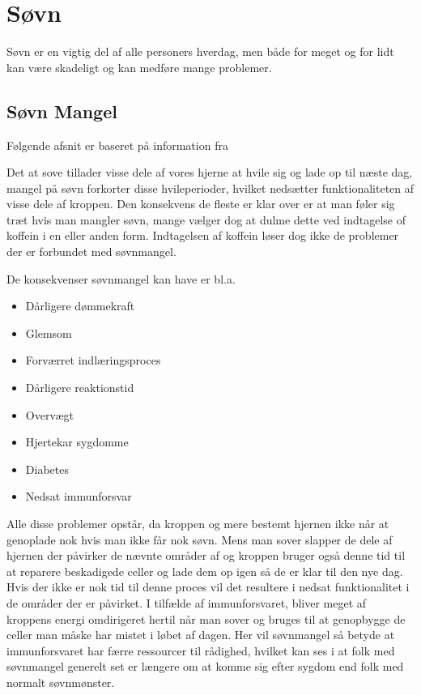 \section{Søvn}
Søvn er en vigtig del af alle personers hverdag, men både for meget og for lidt kan være skadeligt og kan medføre mange problemer.

\subsection{Søvn Mangel}
Følgende afsnit er baseret på information fra \citep{misc:tenThings} \citep{misc:getSleep}

Det at sove tillader visse dele af vores hjerne at hvile sig og lade op til næste dag, mangel på søvn forkorter disse hvileperioder, hvilket nedsætter funktionaliteten af visse dele af kroppen.
Den konsekvens de fleste er klar over er at man føler sig træt hvis man mangler søvn, mange vælger dog at dulme dette ved indtagelse of koffein i en eller anden form.
Indtagelsen af koffein løser dog ikke de problemer der er forbundet med søvnmangel. 

De konsekvenser søvnmangel kan have er bl.a.
\begin{itemize}
\item Dårligere dømmekraft
\item Glemsom
\item Forværret indlæringsproces
\item Dårligere reaktionstid
\item Overvægt
\item Hjertekar sygdomme
\item Diabetes
\item Nedsat immunforsvar
\end{itemize}

Alle disse problemer opstår, da kroppen og mere bestemt hjernen ikke når at genoplade nok hvis man ikke får nok søvn.
Mens man sover slapper de dele af hjernen der påvirker de nævnte områder af og kroppen bruger også denne tid til at reparere beskadigede celler og lade dem op igen så de er klar til den nye dag.
Hvis der ikke er nok tid til denne proces vil det resultere i nedsat funktionalitet i de områder der er påvirket.
I tilfælde af immunforsvaret, bliver meget af kroppens energi omdirigeret hertil når man sover og bruges til at genopbygge de celler man måske har mistet i løbet af dagen.
Her vil søvnmangel så betyde at immunforsvaret har færre ressourcer til rådighed, hvilket kan ses i at folk med søvnmangel generelt set er længere om at komme sig efter sygdom end folk med normalt søvnmønster.

